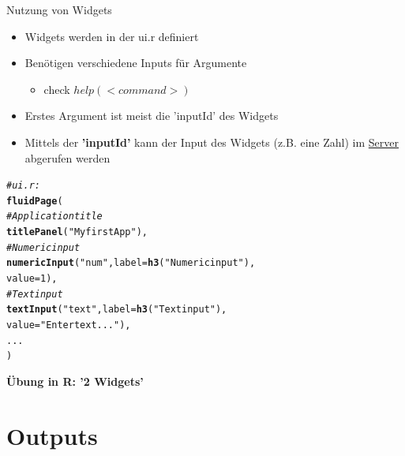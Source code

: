 \documentclass[xcolor=dvipsnames]{beamer}\usepackage[]{graphicx}\usepackage[]{color}
\makeatletter
\newcommand{\hlnum}[1]{\textcolor[rgb]{0.686,0.059,0.569}{#1}}%
\newcommand{\hlstr}[1]{\textcolor[rgb]{0.192,0.494,0.8}{#1}}%
\newcommand{\hlcom}[1]{\textcolor[rgb]{0.678,0.584,0.686}{\textit{#1}}}%
\newcommand{\hlstd}[1]{\textcolor[rgb]{0.345,0.345,0.345}{#1}}%
\newcommand{\hlkwc}[1]{\textcolor[rgb]{0.333,0.667,0.333}{#1}}%
\newcommand{\hlkwd}[1]{\textcolor[rgb]{0.737,0.353,0.396}{\textbf{#1}}}%
\newenvironment{kframe}{%
 \def\at@end@of@kframe{}%
 \ifinner\ifhmode%
  \def\at@end@of@kframe{\end{minipage}}%
  \begin{minipage}{\columnwidth}%
 \fi\fi%
 \def\FrameCommand##1{\hskip\@totalleftmargin \hskip-\fboxsep
 \colorbox{shadecolor}{##1}\hskip-\fboxsep
     \hskip-\linewidth \hskip-\@totalleftmargin \hskip\columnwidth}%
 \MakeFramed {\advance\hsize-\width
   \@totalleftmargin\z@ \linewidth\hsize
   \@setminipage}}%
 {\par\unskip\endMakeFramed%
 \at@end@of@kframe}
\newenvironment{knitrout}{}{} %
\makeatother
\begin{document}
\begin{frame}[fragile]{Nutzung von Widgets}
    \begin{itemize}
      \item Widgets werden in der ui.r definiert
      \item Benötigen verschiedene Inputs für Argumente 
        \begin{itemize}
        \item check $help(<command>)$
        \end{itemize}
      \item Erstes Argument ist meist die 'inputId' des Widgets
      \item Mittels der \textbf{'inputId'} kann der Input des Widgets (z.B. eine Zahl) im \underline{Server} abgerufen werden 
    \end{itemize}
\begin{knitrout}\small
{}\color{fgcolor}\begin{kframe}
\begin{alltt}
\hlcom{#ui.r:}
\hlkwd{fluidPage}\hlstd{(}
    \hlcom{# Application title}
      \hlkwd{titlePanel}\hlstd{(}\hlstr{"My first App"}\hlstd{),}
    \hlcom{#Numeric input}
      \hlkwd{numericInput}\hlstd{(}\hlstr{"num"}\hlstd{,} \hlkwc{label} \hlstd{=} \hlkwd{h3}\hlstd{(}\hlstr{"Numeric input"}\hlstd{),}
                   \hlkwc{value} \hlstd{=} \hlnum{1}\hlstd{),}
    \hlcom{#Text input}
      \hlkwd{textInput}\hlstd{(}\hlstr{"text"}\hlstd{,} \hlkwc{label} \hlstd{=} \hlkwd{h3}\hlstd{(}\hlstr{"Text input"}\hlstd{),}
                \hlkwc{value} \hlstd{=} \hlstr{"Enter text..."}\hlstd{),}
    \hlstd{...}
\hlstd{)}
\end{alltt}
\end{kframe}
\end{knitrout}
\end{frame}


\begin{frame}{}
  \centering
  \textbf{Übung in R: '2 Widgets'}
\end{frame}






\section{Outputs} %
\end{document}
